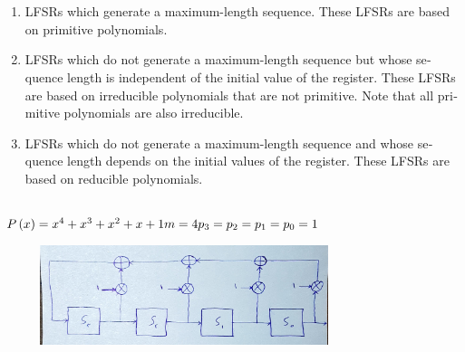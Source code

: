 \documentclass{article}
\begin{document}
\section{}%
\subsection{}
\begin{latin}
\begin{enumerate}
\item LFSRs which generate a maximum-length sequence. These LFSRs are based on
primitive polynomials.
\item LFSRs which do not generate a maximum-length sequence but whose sequence
length is independent of the initial value of the register. These LFSRs are based
on irreducible polynomials that are not primitive. Note that all primitive polynomials are also irreducible.
\item LFSRs which do not generate a maximum-length sequence and whose sequence
length depends on the initial values of the register. These LFSRs are based on
reducible polynomials.
\end{enumerate}
\end{latin}

\subsection{}
\subsubsection{}
\begin{latin}
$
P\left( x \right) = x ^ 4 + x ^ 3 + x ^ 2 + x + 1\\
m = 4\\
p_3 = p_2 = p_1 = p_0 = 1
$
\end{latin}
\begin{figure}[H]
    \centering
    \includegraphics[width=0.75\textwidth]{figures/1.jpg}
    \caption
	{}
    \label{fig:fig1}
\end{figure}
\end{document}
